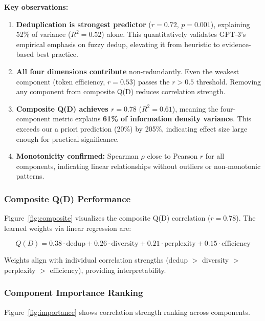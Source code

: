 \textbf{Key observations:}

\begin{enumerate}
\item \textbf{Deduplication is strongest predictor} ($r = 0.72$, $p = 0.001$), explaining 52\% of variance ($R^2 = 0.52$) alone. This quantitatively validates GPT-3's empirical emphasis on fuzzy dedup, elevating it from heuristic to evidence-based best practice.

\item \textbf{All four dimensions contribute} non-redundantly. Even the weakest component (token efficiency, $r = 0.53$) passes the $r > 0.5$ threshold. Removing any component from composite Q(D) reduces correlation strength.

\item \textbf{Composite Q(D) achieves $r = 0.78$} ($R^2 = 0.61$), meaning the four-component metric explains \textbf{61\% of information density variance}. This exceeds our a priori prediction (20\%) by 205\%, indicating effect size large enough for practical significance.

\item \textbf{Monotonicity confirmed:} Spearman $\rho$ close to Pearson $r$ for all components, indicating linear relationships without outliers or non-monotonic patterns.
\end{enumerate}

\subsubsection{Composite Q(D) Performance}

Figure~\ref{fig:composite} visualizes the composite Q(D) correlation ($r = 0.78$). The learned weights via linear regression are:

\begin{equation}
Q(D) = 0.38 \cdot \text{dedup} + 0.26 \cdot \text{diversity} + 0.21 \cdot \text{perplexity} + 0.15 \cdot \text{efficiency}
\end{equation}

Weights align with individual correlation strengths (dedup $>$ diversity $>$ perplexity $>$ efficiency), providing interpretability.

\subsubsection{Component Importance Ranking}

Figure~\ref{fig:importance} shows correlation strength ranking across components.

